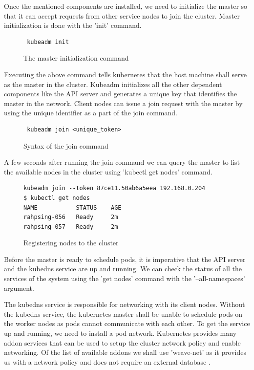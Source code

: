 \documentclass[9pt,twocolumn,twoside]{../../styles/osajnl}
\begin{document}
{\noindent
Once the mentioned components are installed, we need to initialize the
master so that it can accept requests from other service nodes to join
the cluster. Master initialization is done with the 'init' command.

\begin{figure}[H]
\begin{verbatim}
 kubeadm init
\end{verbatim}
\caption{The master initialization command}
\label{The master initialization command}
\end{figure}

\noindent
Executing the above command tells kubernetes that the host machine
shall serve as the master in the cluster. Kubeadm initializes all the
other dependent components like the API server and generates a unique
key that identifies the master in the network. Client nodes can issue
a join request with the master by using the unique identifier as a
part of the join command.

\begin{figure}[H]
\begin{verbatim}
 kubeadm join <unique_token>
\end{verbatim}
\caption{Syntax of the join command}
\label{Syntax of the join command}
\end{figure}

\noindent
A few seconds after running the join command we can query the master
to list the available nodes in the cluster using 'kubectl get nodes' command.

\begin{figure}[H]
\begin{verbatim}
kubeadm join --token 87ce11.50ab6a5eea 192.168.0.204
$ kubectl get nodes
NAME           STATUS    AGE
rahpsing-056   Ready     2m
rahpsing-057   Ready     2m
\end{verbatim}
\caption{Registering nodes to the cluster}
\label{Registering nodes to the cluster}
\end{figure}

\noindent
Before the master is ready to schedule pods, it is imperative that the
API server and the kubedns service are up and running. We can check
the status of all the services of the system using the
'get nodes' command with the '--all-namespaces' argument.

\noindent
The kubedns service is responsible for networking with its client
nodes. Without the kubedns service, the kubernetes master shall be
unable to schedule pods on the worker nodes as pods cannot communicate
with each other. To get the service up and running, we need to install
a pod network. Kubernetes provides many addon services that can be
used to setup the cluster network policy and enable networking. Of the
list of available addons we shall use 'weave-net' as it provides us
with a network policy and does not require an external database
\cite{www-kubernetes-addons}.

}
\end{document}
